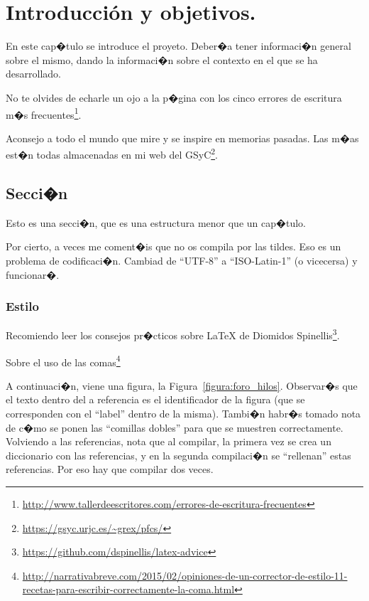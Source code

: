 \documentclass[a4paper, 12pt]{book}
\begin{document}
\cleardoublepage
\chapter{Introducci\'on y objetivos.}
\label{sec:intro} %

En este cap�tulo se introduce el proyeto. Deber�a tener informaci�n general sobre el mismo, dando la informaci�n sobre el contexto en el que se ha desarrollado.

No te olvides de echarle un ojo a la p�gina con los cinco errores de escritura m�s frecuentes\footnote{\url{http://www.tallerdeescritores.com/errores-de-escritura-frecuentes}}.

Aconsejo a todo el mundo que mire y se inspire en memorias pasadas. Las m�as est�n todas almacenadas en mi web del GSyC\footnote{\url{https://gsyc.urjc.es/~grex/pfcs/}}.

\section{Secci�n}
\label{sec:seccion}

Esto es una secci�n, que es una estructura menor que un cap�tulo.

Por cierto, a veces me coment�is que no os compila por las tildes.
Eso es un problema de codificaci�n.
Cambiad de ``UTF-8'' a ``ISO-Latin-1'' (o vicecersa) y funcionar�.

\subsection{Estilo}
\label{subsec:estilo}

Recomiendo leer los consejos pr�cticos sobre LaTeX de Diomidos
Spinellis\footnote{\url{https://github.com/dspinellis/latex-advice}}.

Sobre el uso de las comas\footnote{\url{http://narrativabreve.com/2015/02/opiniones-de-un-corrector-de-estilo-11-recetas-para-escribir-correctamente-la-coma.html}}

A continuaci�n, viene una figura, la Figura~\ref{figura:foro_hilos}.
Observar�s que el texto dentro del a referencia es el identificador de la figura (que se corresponden con el ``label'' dentro de la misma).
Tambi�n habr�s tomado nota de c�mo se ponen las ``comillas dobles'' para que se muestren correctamente.
Volviendo a las referencias, nota que al compilar, la primera vez se crea un diccionario con las referencias, y en la segunda compilaci�n se ``rellenan'' estas referencias.
Por eso hay que compilar dos veces.
\end{document}
